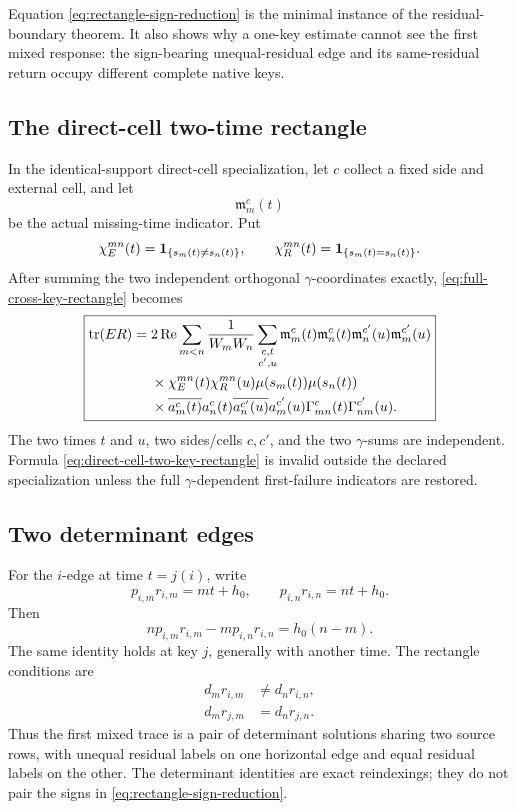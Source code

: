 Equation \eqref{eq:rectangle-sign-reduction} is the minimal instance of the
residual-boundary theorem.  It also shows why a one-key estimate cannot
see the first mixed response: the sign-bearing unequal-residual edge and
its same-residual return occupy different complete native keys.

\subsection{The direct-cell two-time rectangle}

In the identical-support direct-cell specialization, let \(c\) collect a
fixed side and external cell, and let
\[
 \mathfrak m_m^c(t)
\]
be the actual missing-time indicator.  Put
\[
 \chi_E^{mn}(t)=\mathbf 1_{\{s_m(t)\ne s_n(t)\}},
 \qquad
 \chi_R^{mn}(t)=\mathbf 1_{\{s_m(t)=s_n(t)\}}.
\]
After summing the two independent orthogonal \(\gamma\)-coordinates
exactly, \eqref{eq:full-cross-key-rectangle} becomes
\begin{equation}
\boxed{
\begin{aligned}
\operatorname{tr}(ER)
={}&
2\operatorname{Re}
\sum_{m<n}\frac1{W_mW_n}
\sum_{\substack{c,t\\c',u}}
\mathfrak m_m^c(t)\mathfrak m_n^c(t)
\mathfrak m_n^{c'}(u)\mathfrak m_m^{c'}(u)
\\
&\times
\chi_E^{mn}(t)\chi_R^{mn}(u)
\mu(s_m(t))\mu(s_n(t))
\\
&\times
\overline{a_m^c(t)}a_n^c(t)
\overline{a_n^{c'}(u)}a_m^{c'}(u)
\Gamma_{mn}^c(t)\Gamma_{nm}^{c'}(u).
\end{aligned}}
\label{eq:direct-cell-two-key-rectangle}
\end{equation}
The two times \(t\) and \(u\), two sides/cells \(c,c'\), and the two
\(\gamma\)-sums are independent.  Formula
\eqref{eq:direct-cell-two-key-rectangle} is invalid outside the declared
specialization unless the full \(\gamma\)-dependent first-failure
indicators are restored.

\subsection{Two determinant edges}

For the \(i\)-edge at time \(t=j(i)\), write
\[
 p_{i,m}r_{i,m}=mt+h_0,\qquad
 p_{i,n}r_{i,n}=nt+h_0.
\]
Then
\begin{equation}
 n p_{i,m}r_{i,m}-m p_{i,n}r_{i,n}
 =h_0(n-m).
 \label{eq:i-edge-determinant}
\end{equation}
The same identity holds at key \(j\), generally with another time.  The
rectangle conditions are
\begin{align}
 d_mr_{i,m}&\ne d_nr_{i,n},
 \label{eq:E-determinant-condition}\\
 d_mr_{j,m}&=d_nr_{j,n}.
 \label{eq:R-determinant-condition}
\end{align}
Thus the first mixed trace is a pair of determinant solutions sharing two
source rows, with unequal residual labels on one horizontal edge and equal
residual labels on the other.  The determinant identities are exact
reindexings; they do not pair the signs in
\eqref{eq:rectangle-sign-reduction}.
